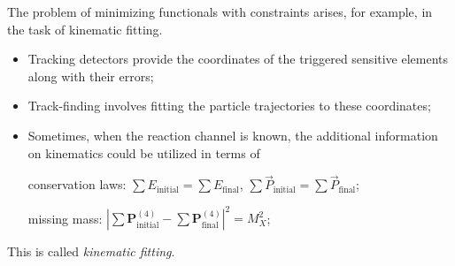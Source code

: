 The problem of minimizing functionals with constraints arises, for example, in the task of kinematic fitting.
\begin{itemize}
\item Tracking detectors provide the coordinates of the triggered sensitive elements along with their errors;
\item Track-finding involves fitting the particle trajectories to these coordinates;
\item Sometimes, when the reaction channel is known, the additional information on kinematics could be utilized in terms of
\item[conservation laws:] $\sum E_\mathrm{initial} = \sum E_\mathrm{final}$, $\displaystyle\sum\vec{P}_\mathrm{initial} = \sum\vec{P}_\mathrm{final}$;
\item[missing mass:] $\displaystyle\left|\sum\boldsymbol{P}^{(4)}_\mathrm{initial} - \sum\boldsymbol{P}^{(4)}_\mathrm{final}\right|^2 = M_X^2$;
\end{itemize}

This is called \emph{kinematic fitting}.
